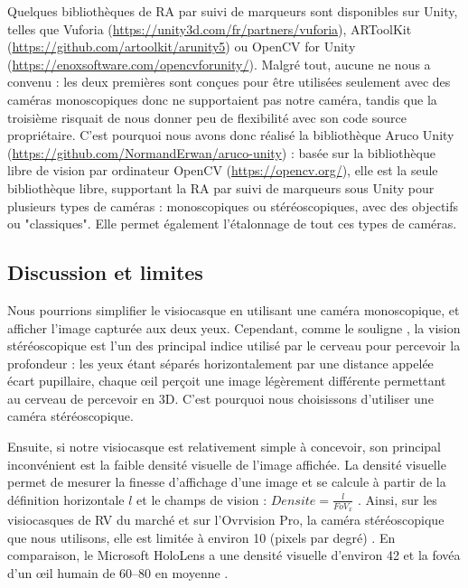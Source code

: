 Quelques bibliothèques de RA par suivi de marqueurs sont disponibles sur Unity, telles que Vuforia (\url{https://unity3d.com/fr/partners/vuforia}), ARToolKit (\url{https://github.com/artoolkit/arunity5}) ou OpenCV for Unity (\url{https://enoxsoftware.com/opencvforunity/}). Malgré tout, aucune ne nous a convenu : les deux premières sont conçues pour être utilisées seulement avec des caméras monoscopiques donc ne supportaient pas notre caméra, tandis que la troisième risquait de nous donner peu de flexibilité avec son code source propriétaire. C'est pourquoi nous avons donc réalisé la bibliothèque Aruco Unity (\url{https://github.com/NormandErwan/aruco-unity}) : basée sur la bibliothèque libre de vision par ordinateur OpenCV (\url{https://opencv.org/}), elle est la seule bibliothèque libre, supportant la RA par suivi de marqueurs sous Unity pour plusieurs types de caméras : monoscopiques ou stéréoscopiques, avec des objectifs  ou "classiques". Elle permet également l'étalonnage de tout ces types de caméras.


\subsection{Discussion et limites}
\label{subsec:solution_discusion}
Nous pourrions simplifier le visiocasque en utilisant une caméra monoscopique, et afficher l'image capturée aux deux yeux. Cependant, comme le souligne \cite{Bourke1999}, la vision stéréoscopique est l'un des principal indice utilisé par le cerveau pour percevoir la profondeur : les yeux étant séparés horizontalement par une distance appelée écart pupillaire, chaque \oe il perçoit une image légèrement différente  permettant au cerveau de percevoir en 3D. C'est pourquoi nous choisissons d'utiliser une caméra stéréoscopique.


Ensuite, si notre visiocasque est relativement simple à concevoir, son principal inconvénient est la faible densité visuelle de l'image affichée. La densité visuelle permet de mesurer la finesse d'affichage d'une image et se calcule à partir de la définition horizontale $l$ et le champs de vision : $Densite = \frac{l}{FoV_x}$ \citep{Boger2017}. Ainsi, sur les visiocasques de RV du marché et sur l'Ovrvision Pro, la caméra stéréoscopique que nous utilisons, elle est limitée à environ \SI{10}{\ppd} (pixels par degré) . En comparaison, le Microsoft HoloLens a une densité visuelle d'environ \SI{42}{\ppd} et la fovéa d'un \oe il humain de \SIrange{60}{80}{\ppd} en moyenne \citep{Kistner2014}.

